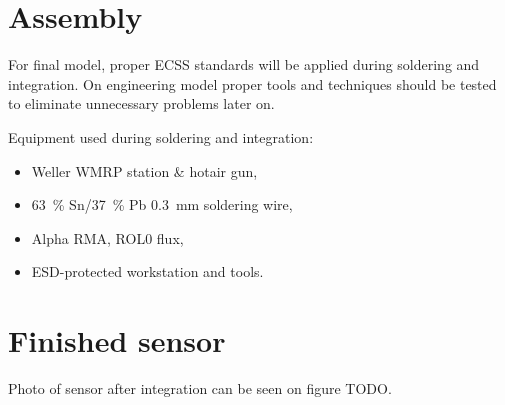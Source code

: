 \section{Assembly}
    For final model, proper ECSS standards will be applied during soldering and integration. On engineering model proper tools and techniques should be tested to eliminate unnecessary problems later on.

    Equipment used during soldering and integration:
    \begin{itemize}
        \item Weller WMRP station \& hotair gun,
        \item \SI{63}{\percent} Sn/\SI{37}{\percent} Pb \SI{0.3}{\milli\meter} soldering wire,
        \item Alpha RMA, ROL0 flux,
        \item ESD-protected workstation and tools.
    \end{itemize}

\section{Finished sensor}
    Photo of sensor after integration can be seen on figure TODO.
    
